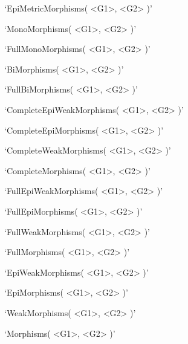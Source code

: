 `EpiMetricMorphisms( <G1>, <G2> )'

`MonoMorphisms( <G1>, <G2> )'

`FullMonoMorphisms( <G1>, <G2> )'

`BiMorphisms( <G1>, <G2> )'

`FullBiMorphisms( <G1>, <G2> )'

`CompleteEpiWeakMorphisms( <G1>, <G2> )'

`CompleteEpiMorphisms( <G1>, <G2> )'

`CompleteWeakMorphisms( <G1>, <G2> )'

`CompleteMorphisms( <G1>, <G2> )'

`FullEpiWeakMorphisms( <G1>, <G2> )'

`FullEpiMorphisms( <G1>, <G2> )'

`FullWeakMorphisms( <G1>, <G2> )'

`FullMorphisms( <G1>, <G2> )'

`EpiWeakMorphisms( <G1>, <G2> )'

`EpiMorphisms( <G1>, <G2> )'

`WeakMorphisms( <G1>, <G2> )'

`Morphisms( <G1>, <G2> )'
\enditems


